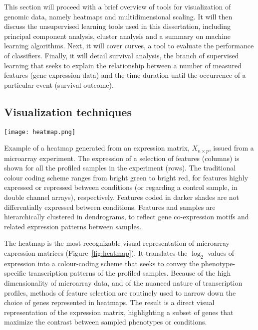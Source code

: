 
\medskip

This section will proceed with a brief overview of tools for visualization of
genomic data, namely heatmaps and multidimensional scaling.  It will then
discuss the unsupervised learning tools used in this dissertation, including
principal component analysis, cluster analysis and a summary on machine learning
algorithms.  Next, it will cover  curves, a tool to evaluate the
performance of classifiers.
Finally, it will detail survival analysis, the branch of supervised learning
that seeks to explain the relationship between a number of measured features
(gene expression data) and the time duration until the occurrence of a
particular event (survival outcome).

\subsection{Visualization techniques}
\label{sec:methods-visualization}
\begin{marginfigure}%
    \texttt{[image: heatmap.png]}
    \caption[Example of a heatmap]{Example of a heatmap generated from an
      expression matrix, $X_{n \times p}$, issued from a 
      microarray experiment.  The expression of a selection of features
      (columns) is shown for all the profiled samples in the experiment (rows).
      The traditional colour coding scheme ranges from bright green to bright
      red, for features highly expressed or repressed between conditions (or
      regarding a control sample, in double channel arrays), respectively.
      Features coded in darker shades are not differentially expressed between
      conditions.  Features and samples are hierarchically clustered in
      dendrograms, to reflect gene co-expression motifs and related expression
      patterns between samples.}
    \label{fig:heatmap}%
\end{marginfigure}

The heatmap is the most recognizable visual representation of microarray
expression matrices (Figure~\ref{fig:heatmap}).  It translates the $\log_2$
values of expression into a colour-coding scheme that seeks to convey the
phenotype-specific transcription patterns of the profiled samples.  Because of
the high dimensionality of microarray data, and of the nuanced nature of
transcription profiles, methods of feature selection are routinely used to
narrow down the choice of genes represented in heatmaps.  The result is a direct
visual representation of the expression matrix, highlighting a subset of genes
that maximize the contrast between sampled phenotypes or conditions.

